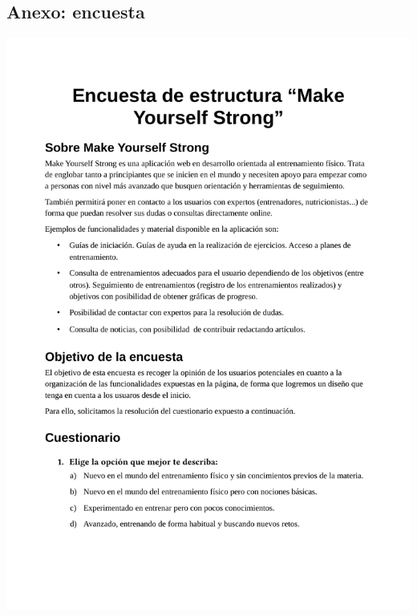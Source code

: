 \documentclass[a4paper]{article}
\begin{document}
 \subsection{Anexo: encuesta}
 
 \includegraphics[width=\textwidth, page=1]{./figuras/encuesta.pdf}
\end{document}

